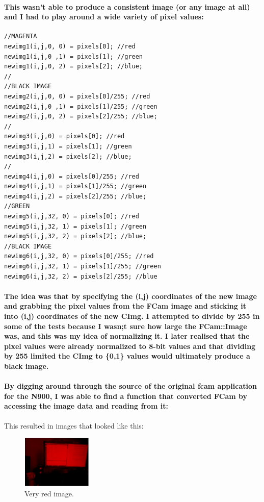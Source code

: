 \documentclass[11pt]{article} %
\begin{document}
\paragraph{This wasn't able to produce a consistent image (or any image at all) and I had to play around a wide variety of pixel values:}
\begin{verbatim}
//MAGENTA
newimg1(i,j,0, 0) = pixels[0]; //red
newimg1(i,j,0 ,1) = pixels[1]; //green
newimg1(i,j,0, 2) = pixels[2]; //blue;
//
//BLACK IMAGE
newimg2(i,j,0, 0) = pixels[0]/255; //red
newimg2(i,j,0 ,1) = pixels[1]/255; //green
newimg2(i,j,0, 2) = pixels[2]/255; //blue;
//
newimg3(i,j,0) = pixels[0]; //red
newimg3(i,j,1) = pixels[1]; //green
newimg3(i,j,2) = pixels[2]; //blue;
//
newimg4(i,j,0) = pixels[0]/255; //red
newimg4(i,j,1) = pixels[1]/255; //green
newimg4(i,j,2) = pixels[2]/255; //blue;
//GREEN
newimg5(i,j,32, 0) = pixels[0]; //red
newimg5(i,j,32, 1) = pixels[1]; //green
newimg5(i,j,32, 2) = pixels[2]; //blue;
//BLACK IMAGE
newimg6(i,j,32, 0) = pixels[0]/255; //red
newimg6(i,j,32, 1) = pixels[1]/255; //green
newimg6(i,j,32, 2) = pixels[2]/255; //blue
\end{verbatim}
\paragraph{The idea was that by specifying the (i,j) coordinates of the new image and grabbing the pixel values from the FCam image and sticking it into (i,j) coordinates of the new CImg. I attempted to divide by 255 in some of the tests because I wasn;t sure how large the FCam::Image was, and this was my idea of normalizing it. I later realised that the pixel values were already normalized to 8-bit values and that dividing by 255 limited the CImg to \{0,1\} values would ultimately produce a black image.}
\paragraph{By digging around through the source of the original fcam application for the N900, I was able to find a function that converted FCam by accessing the image data and reading from it:}

This resulted in images that looked like this:
\begin{figure}
	\vspace{-20pt}
	\begin{center}
		\includegraphics[width=0.3\textwidth]{images/redbuffer1}
	\end{center}
	\vspace{-20pt}
	\caption{Very red image.}
\end{figure}
\end{document}
